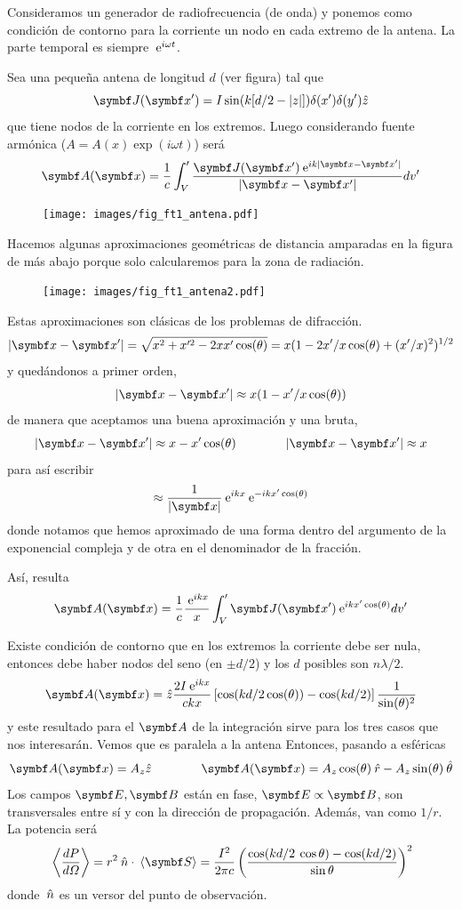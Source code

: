 \documentclass[10pt,oneside]{CBFT_book}
\begin{document}
Consideramos un generador de radiofrecuencia (de onda) y ponemos como condición de contorno
para la corriente un nodo en cada extremo de la antena.
La parte temporal es siempre $\:\mathrm{e}^{i \omega t}$.

Sea una pequeña antena de longitud $d$ (ver figura) tal que 
\[
	\vb{J}(\vb{x}') = I \sin( k[d/2 - |z|] ) \delta(x') \delta(y')  \hat{z}
\]
que tiene nodos de la corriente en los extremos. Luego considerando fuente armónica ($A=A(x)\exp(i\omega t)$)
será
\[
	\vb{A}(\vb{x}) = \frac{1}{c} \int_V' \frac{ \vb{J}(\vb{x}') \euler^{ i k |\vb{x}-\vb{x}'| }}
	{ |\vb{x}-\vb{x}'| } dv'
\]

\begin{figure}[htb]
	\begin{center}
	\texttt{[image: images/fig\_ft1\_antena.pdf]}	 
	\end{center}
	\caption{}
\end{figure} 

Hacemos algunas aproximaciones geométricas de distancia amparadas en la figura de más abajo porque
solo calcularemos para la zona de radiación.
	
\begin{figure}[htb]
	\begin{center}
	\texttt{[image: images/fig\_ft1\_antena2.pdf]}	 
	\end{center}
	\caption{}
\end{figure} 

Estas aproximaciones son clásicas de los problemas de difracción.
\[
	|\vb{x}-\vb{x}'| = \sqrt{ x^2 + x'^2 - 2xx'\cos(\theta)} =  
	x( 1 - 2x'/x \cos(\theta) + (x'/x)^2)^{1/2} 
\]
y quedándonos a primer orden,
\[
	|\vb{x}-\vb{x}'|\approx x (1 - x'/x \cos(\theta))
\]
de manera que aceptamos una buena aproximación y una bruta,
\[
	|\vb{x}-\vb{x}'| \approx x - x' \cos( \theta ) \qquad \qquad |\vb{x}-\vb{x}'| \approx x
\]
para así escribir
\[
	\approx \frac{1}{|\vb{x}|} \euler^{ikx} \euler^{-ikx'\cos(\theta)}
\]
donde notamos que hemos aproximado de una forma dentro del argumento de la exponencial compleja
y de otra en el denominador de la fracción.

Así, resulta
\[
	\vb{A}(\vb{x}) = \frac{1}{c} \frac{\euler^{ i k x} }{x} \int_V' \vb{J}(\vb{x}') 
		\euler^{ i k x' \cos(\theta) } dv'
\]

Existe condición de contorno que en los extremos la corriente debe ser nula, entonces debe haber nodos
del seno (en $\pm d/2$) y los $d$ posibles son $ n\lambda/2$.
\[
	\vb{A}(\vb{x}) = \hat{z} \frac{2I\euler^{ikx}}{ckx}\left[ \cos( kd/2 \cos(\theta) )- 
		\cos( kd/2 ) \right]\frac{1}{\sin(\theta)^2}
\]
y este resultado para el $\vb A$ de la integración sirve para los tres casos que nos interesarán.
Vemos que es paralela a la antena
Entonces, pasando a esféricas
\[
	\vb{A}(\vb{x}) = A_z \hat{z} \qquad \qquad \vb{A}(\vb{x}) =  A_z\cos(\theta)\rver - 
		A_z\sin(\theta) \thetaver
\]
Los campos $\vb E, \vb B$ están en fase, $\vb E \propto \vb B$, son transversales entre sí y con
la dirección de propagación. Además, van como $ 1 / r $.
La potencia será
\[
	\vm{ \dtot{P}{\Omega} } = r^2 \nver \cdot \vm{ \vb S } =
	\frac{I^2}{2\pi c} \Frac{\cos( kd/2 \: \cos\theta ) - \cos( kd/2 )}{\sin\theta}^2
\]
donde $\:\hat{n}$ es un versor del punto de observación.
\end{document}
